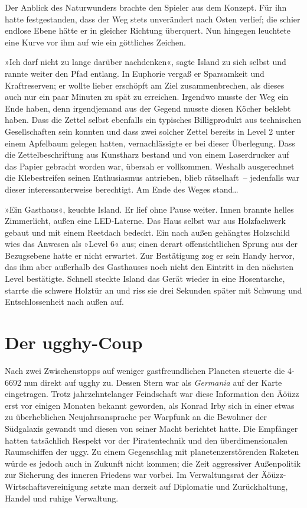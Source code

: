 Der Anblick des Naturwunders brachte den Spieler aus dem Konzept. Für ihn hatte festgestanden, dass der Weg stets unverändert nach Osten verlief; die schier endlose Ebene hätte er in gleicher Richtung überquert. Nun hingegen leuchtete eine Kurve vor ihm auf wie ein göttliches Zeichen.

»Ich darf nicht zu lange darüber nachdenken«, sagte Island zu sich selbst und rannte weiter den Pfad entlang. In Euphorie vergaß er Sparsamkeit und Kraftreserven; er wollte lieber erschöpft am Ziel zusammenbrechen, als dieses auch nur ein paar Minuten zu spät zu erreichen. Irgendwo musste der Weg ein Ende haben, denn irgendjemand aus der Gegend musste diesen Köcher beklebt haben. Dass die Zettel selbst ebenfalls ein typisches Billigprodukt aus technischen Gesellschaften sein konnten und dass zwei solcher Zettel bereits in Level 2 unter einem Apfelbaum gelegen hatten, vernachlässigte er bei dieser Überlegung. Dass die Zettelbeschriftung aus Kunstharz bestand und von einem Laserdrucker auf das Papier gebracht worden war, übersah er vollkommen. Weshalb ausgerechnet die Klebestreifen seinen Enthusiasmus antrieben, blieb rätselhaft~– jedenfalls war dieser interessanterweise berechtigt. Am Ende des Weges stand…

»Ein Gasthaus«, keuchte Island. Er lief ohne Pause weiter. Innen brannte helles Zimmerlicht, außen eine LED-Laterne. Das Haus selbst war aus Holzfachwerk gebaut und mit einem Reetdach bedeckt. Ein nach außen gehängtes Holzschild wies das Anwesen als »Level 6« aus; einen derart offensichtlichen Sprung aus der Bezugsebene hatte er nicht erwartet. Zur Bestätigung zog er sein Handy hervor, das ihm aber außerhalb des Gasthauses noch nicht den Eintritt in den nächsten Level bestätigte. Schnell steckte Island das Gerät wieder in eine Hosentasche, starrte die schwere Holztür an und riss sie drei Sekunden später mit Schwung und Entschlossenheit nach außen auf.


\chapter{Der ugghy-Coup}

Nach zwei Zwischenstopps auf weniger gastfreundlichen Planeten steuerte die 4-6692 nun direkt auf ugghy zu. Dessen Stern war als \textit{Germania} auf der Karte eingetragen. Trotz jahrzehntelanger Feindschaft war diese Information den Äöüzz erst vor einigen Monaten bekannt geworden, als Konrad Irby sich in einer etwas zu überheblichen Neujahrsansprache per Warpfunk an die Bewohner der Südgalaxis gewandt und diesen von seiner Macht berichtet hatte. Die Empfänger hatten tatsächlich Respekt vor der Piratentechnik und den überdimensionalen Raumschiffen der uggy. Zu einem Gegenschlag mit planetenzerstörenden Raketen würde es jedoch auch in Zukunft nicht kommen; die Zeit aggressiver Außenpolitik zur Sicherung des inneren Friedens war vorbei. Im Verwaltungsrat der Äöüzz-Wirtschaftsvereinigung setzte man derzeit auf Diplomatie und Zurückhaltung, Handel und ruhige Verwaltung.

